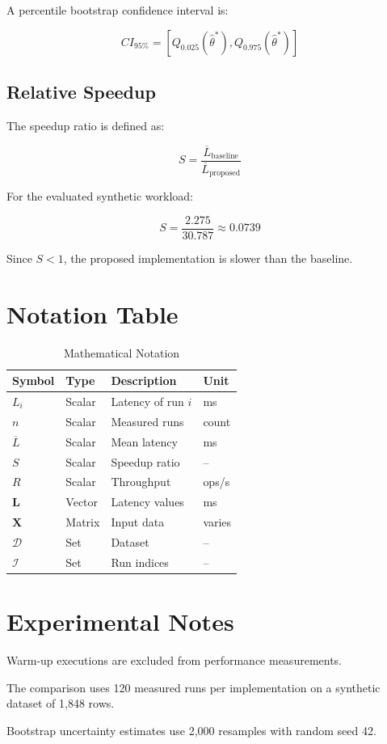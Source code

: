 \documentclass[11pt,a4paper]{article}
\begin{document}
A percentile bootstrap confidence interval is:

\begin{equation}
CI_{95\%} =
\left[
Q_{0.025}(\hat{\theta}^{*}),
Q_{0.975}(\hat{\theta}^{*})
\right]
\label{eq:bootstrap_ci}
\end{equation}

\subsection{Relative Speedup}

The speedup ratio is defined as:

\begin{equation}
S =
\frac{\overline{L}_{\mathrm{baseline}}}
     {\overline{L}_{\mathrm{proposed}}}
\label{eq:speedup}
\end{equation}

For the evaluated synthetic workload:

\begin{equation}
S = \frac{2.275}{30.787}
\approx 0.0739
\end{equation}

Since $S < 1$, the proposed implementation
is slower than the baseline.

\section{Notation Table}

\begin{table}[htbp]
\centering
\caption{Mathematical Notation}
\label{tab:notation}
\begin{tabular}{llll}
\toprule
Symbol & Type & Description & Unit \\
\midrule
$L_i$ & Scalar & Latency of run $i$ & ms \\
$n$ & Scalar & Measured runs & count \\
$\overline{L}$ & Scalar & Mean latency & ms \\
$S$ & Scalar & Speedup ratio & -- \\
$R$ & Scalar & Throughput & ops/s \\
$\mathbf{L}$ & Vector & Latency values & ms \\
$\mathbf{X}$ & Matrix & Input data & varies \\
$\mathcal{D}$ & Set & Dataset & -- \\
$\mathcal{I}$ & Set & Run indices & -- \\
\bottomrule
\end{tabular}
\end{table}

\section{Experimental Notes}

Warm-up executions are excluded from
performance measurements.

The comparison uses 120 measured runs
per implementation on a synthetic
dataset of 1,848 rows.

Bootstrap uncertainty estimates use
2,000 resamples with random seed 42.
\clearpage

\end{document}
